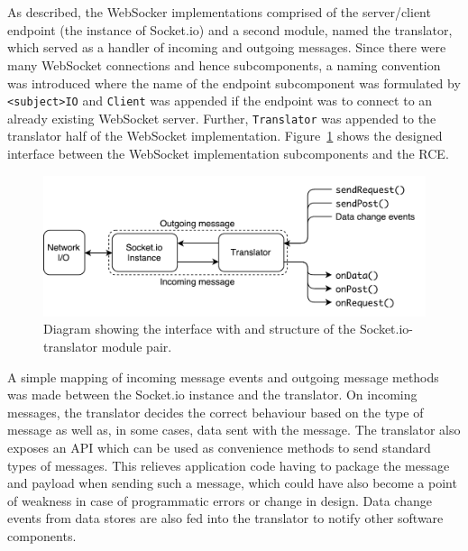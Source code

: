       
      \\\\
        As described, the WebSocker implementations comprised of the server/client endpoint (the instance of Socket.io) and a second module, named the translator, which served as a handler of incoming and outgoing messages. Since there were many WebSocket connections and hence subcomponents, a naming convention was introduced where the name of the endpoint subcomponent was formulated by \texttt{<subject>IO} and \texttt{Client} was appended if the endpoint was to connect to an already existing WebSocket server. Further, \texttt{Translator} was appended to the translator half of the WebSocket implementation. Figure~\ref{fig:softDesign-webSocketDesign} shows the designed interface between the WebSocket implementation subcomponents and the RCE.
        
        \begin{figure}[h!]
          \centering
          \includegraphics[width=0.75\linewidth]{figures/softDesign-webSocketDesign}
          \caption[Diagram showing the interface with and structure of the Socket.io-translator module pair.]{Diagram showing the interface with and structure of the Socket.io-translator module pair.}
          \label{fig:softDesign-webSocketDesign}
        \end{figure}
        
        A simple mapping of incoming message events and outgoing message methods was made between the Socket.io instance and the translator. On incoming messages, the translator decides the correct behaviour based on the type of message as well as, in some cases, data sent with the message. The translator also exposes an API which can be used as convenience methods to send standard types of messages. This relieves application code having to package the message and payload when sending such a message, which could have also become a point of weakness in case of programmatic errors or change in design. Data change events from data stores are also fed into the translator to notify other software components.
                
           